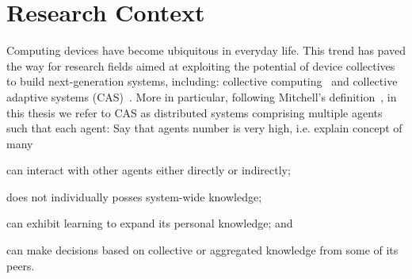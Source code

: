 \documentclass[12pt]{article}
\newcommand{\todoinline}[1]{{\color{violet} #1}}
\begin{document}
\section{Research Context}\label{sec:intro}

Computing devices have become ubiquitous in everyday life.
%
This trend has paved the way for research fields aimed at exploiting
 the potential of device collectives to build next-generation systems, 
 including: collective computing~\cite{DBLP:journals/computer/Abowd16}
 and collective adaptive systems (CAS)~\cite{DBLP:journals/sttt/WirsingJN23,robyphdthesis}.
%
More in particular, following Mitchell's definition~\cite{DBLP:conf/metacognition/Mitchell05}, 
 in this thesis we refer to CAS as distributed systems comprising multiple agents 
 such that each agent: \todoinline{Say that agents number is very high, i.e. explain concept of many}
 \begin{enumerate*}[label=(\roman*)]
	\item can interact with other agents either directly or indirectly;
	\item does not individually posses system-wide knowledge;
	\item can exhibit learning to expand its personal knowledge; and
	\item can make decisions based on collective or aggregated knowledge from some of its peers.
 \end{enumerate*}
\end{document}

